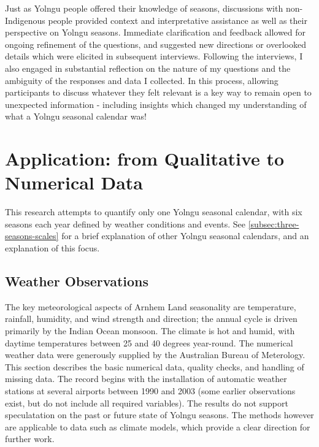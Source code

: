 Just as Yolngu people offered their knowledge of seasons, discussions with
non-Indigenous people provided context and interpretative assistance as well
as their perspective on Yolngu seasons.  Immediate clarification and
feedback allowed for ongoing refinement of the questions, and suggested
new directions or overlooked details which were elicited in subsequent
interviews.
%
Following the interviews, I also engaged in substantial reflection on the nature
of my questions and the ambiguity of the responses and data I collected.
In this process, allowing participants to discuss whatever they felt relevant
is a key way to remain open to unexpected information - including insights
which changed my understanding of what a Yolngu seasonal calendar was!



\section{Application: from Qualitative to Numerical Data}

This research attempts to quantify only one Yolngu seasonal calendar, with six
seasons each year defined by weather conditions and events.  See
\cref{subsec:three-seasons-scales} for a brief explanation of other
Yolngu seasonal calendars, and an explanation of this focus.

\subsection{Weather Observations}

The key meteorological aspects of Arnhem Land seasonality are temperature,
rainfall, humidity, and wind strength and direction; the annual
cycle is driven primarily by the Indian Ocean monsoon.  The climate is hot and
humid, with daytime temperatures between 25 and 40 degrees year-round.
%
The numerical weather data were generously supplied by the Australian
Bureau of Meterology.  This section describes the basic numerical data,
quality checks, and handling of missing data.
The record begins with the installation of automatic weather stations
at several airports between 1990 and 2003  (some earlier observations exist,
but do not include all required variables).  The results do not support
speculatation on the past or future state of Yolngu seasons.  The methods
however are applicable to data such as climate models, which provide
a clear direction for further work.

